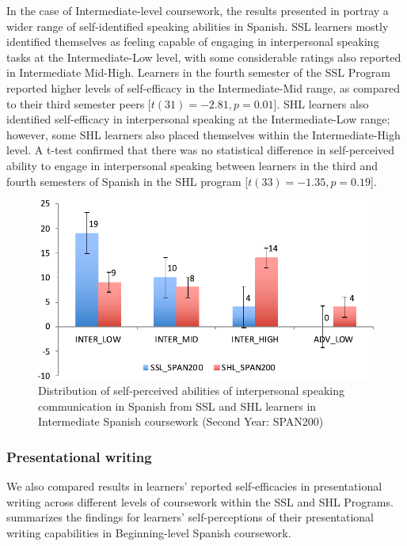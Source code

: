 \documentclass[output=paper]{langscibook}
\begin{document}
\begin{sloppypar}
In the case of Intermediate-level coursework, the results presented in  portray a wider range of self-identified speaking abilities in Spanish. SSL learners mostly identified themselves as feeling capable of engaging in interpersonal speaking tasks at the Intermediate-Low level, with some considerable ratings also reported in Intermediate Mid-High. Learners in the fourth semester of the SSL Program reported higher levels of self-efficacy in the Intermediate-Mid range, as compared to their third semester peers [$t(31) = -2.81,\allowbreak p = 0.01$]. SHL learners also identified self-efficacy in interpersonal speaking at the Intermediate-Low range; however, some SHL learners also placed themselves within the Intermediate-High level. A t-test confirmed that there was no statistical difference in self-perceived ability to engage in interpersonal speaking between learners in the third and fourth semesters of Spanish in the SHL program [$t(33) = -1.35,\allowbreak p = 0.19$].
\end{sloppypar}

\begin{figure}
\includegraphics[width=\textwidth]{figures/Figure2-Chapter3.pdf}
\caption{Distribution of self-perceived abilities of interpersonal speaking communication in Spanish from SSL and SHL learners in Intermediate Spanish coursework (Second Year: SPAN200)}
\label{fig:3:2}
\end{figure}


\subsubsection{Presentational writing} We also compared results in learners’ reported self-efficacies in presentational writing across different levels of coursework within the SSL and SHL Programs.  summarizes the findings for learners’ self-perceptions of their presentational writing capabilities in Beginning-level Spanish coursework.
\end{document}
